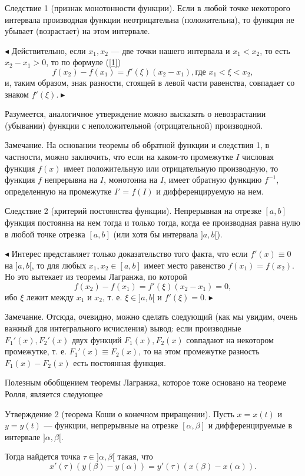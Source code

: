 \documentclass[14pt]{extreport}
\begin{document}
Следствие 1 (признак монотонности функции). Если в любой точке некоторого интервала производная функции неотрицательна (положительна), то функция не убывает (возрастает) на этом интервале.

$\blacktriangleleft$ Действительно, если $x_1, x_2$ — две точки нашего интервала и $x_1 < x_2$, то есть
$x_2 - x_1>0$, то по формуле (\ref {1})
\[f(x_2)- f(x_1) = f'(\xi)(x_2 - x_1), \text{где } x_1 < \xi < x_2,\]
и, таким образом, знак разности, стоящей в левой части равенства, совпадает со знаком $f'(\xi). \blacktriangleright$

Разумеется, аналогичное утверждение можно высказать о невозрастании (убывании) функции с неположительной (отрицательной) производной. 

Замечание. На основании теоремы об обратной функции и следствия 1, в частности, можно заключить, что если на каком-то промежутке $I$ числовая функция $f(x)$ имеет положительную или отрицательную производную, то функция $f$ непрерывна на $I$, монотонна на $I$, имеет обратную функцию $f^{-1}$, определенную на промежутке $I' = f(I)$ и дифференцируемую на нем.

Следствие 2 (критерий постоянства функции). Непрерывная на отрезке $[a, b]$ функция постоянна на нем тогда и только тогда, когда ее производная
равна нулю в любой точке отрезка $[a, b]$ (или хотя бы интервала $]a, b[$).

$\blacktriangleleft$ Интерес представляет только доказательство того факта, что если $f'(x)\equiv0$ на $]a, b[$, то для любых $x_1, x_2 \in[a, b]$ имеет место равенство $f (x_1)= f (x_2).$ Но это вытекает из теоремы Лагранжа, по которой
\[f (x_2)- f (x_1) = f'(\xi)(x_2 - x_1) = 0,\]
ибо $\xi$ лежит между $x_1$ и $x_2$, т. е. $\xi\in]a, b[$ и $f'(\xi)=0. \blacktriangleright$

Замечание. Отсюда, очевидно, можно сделать следующий (как мы увидим, очень важный для интегрального исчисления) вывод: если производные $F_1'(x), F_2'(x)$ двух функций $F_1(x), F_2(x)$ совпадают на некотором промежутке, т. е. $F_1'(x) \equiv F_2(x)$, то на этом промежутке разность $F_1(x) - F_2(x)$ есть постоянная функция.

Полезным обобщением теоремы Лагранжа, которое тоже основано на теореме Ролля, является следующее

Утверждение 2 (теорема Коши о конечном приращении). Пусть $x = x(t)$ и $y = y(t)$ — функции, непрерывные на отрезке $[\alpha, \beta]$ и дифференцируемые в интервале $]\alpha, \beta[$.

Тогда найдется точка $\tau\in]\alpha, \beta[$ такая, что
\[x'(\tau)( y(\beta)- y(\alpha)) = y'(\tau)(x(\beta)- x(\alpha)).\]
\end{document}
